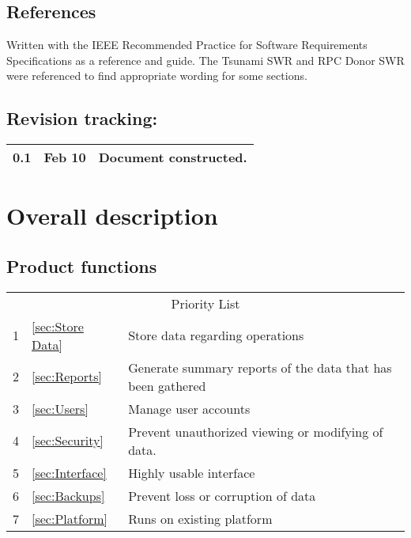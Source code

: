 \documentclass[12pt]{article}
\begin{document}
\subsection{References}
Written with the IEEE Recommended Practice for Software Requirements Specifications as a reference and guide. The Tsunami SWR and RPC Donor SWR were referenced to find appropriate wording for some sections.

\subsection{Revision tracking:}
\begin{tabular}{|l|r|p{5in}|}
\hline
0.1 & Feb 10 & Document constructed.\\
\hline
\end{tabular}

\section{Overall description}
\subsection{Product functions}

\begin{tabular}{l | l p{5.25in}}
\multicolumn{3}{c}{Priority List}\\
1 &\ref{sec:Store Data}			& Store data regarding operations \\
2 &\ref{sec:Reports}			& Generate summary reports of the data that has been gathered\\
3 &\ref{sec:Users}				& Manage user accounts\\
4 &\ref{sec:Security}			& Prevent unauthorized viewing or modifying of data. \\
5 &\ref{sec:Interface}			& Highly usable interface\\ 
6 &\ref{sec:Backups}			& Prevent loss or corruption of data\\
7 &\ref{sec:Platform}			& Runs on existing platform\\
\end{tabular}
\end{document}
